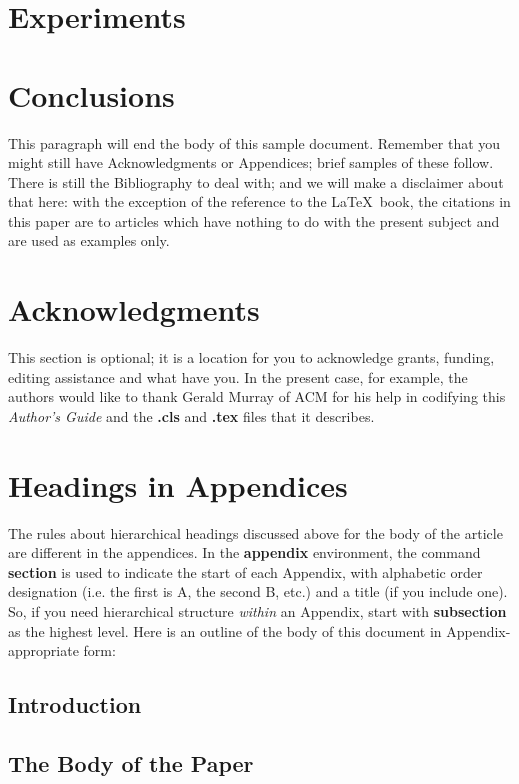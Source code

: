 \documentclass{sig-alternate}
\begin{document}
\section{Experiments}


\section{Conclusions}
This paragraph will end the body of this sample document.
Remember that you might still have Acknowledgments or
Appendices; brief samples of these
follow.  There is still the Bibliography to deal with; and
we will make a disclaimer about that here: with the exception
of the reference to the \LaTeX\ book, the citations in
this paper are to articles which have nothing to
do with the present subject and are used as
examples only.

\section{Acknowledgments}
This section is optional; it is a location for you
to acknowledge grants, funding, editing assistance and
what have you.  In the present case, for example, the
authors would like to thank Gerald Murray of ACM for
his help in codifying this \textit{Author's Guide}
and the \textbf{.cls} and \textbf{.tex} files that it describes.



  
\appendix
\section{Headings in Appendices}
The rules about hierarchical headings discussed above for
the body of the article are different in the appendices.
In the \textbf{appendix} environment, the command
\textbf{section} is used to
indicate the start of each Appendix, with alphabetic order
designation (i.e. the first is A, the second B, etc.) and
a title (if you include one).  So, if you need
hierarchical structure
\textit{within} an Appendix, start with \textbf{subsection} as the
highest level. Here is an outline of the body of this
document in Appendix-appropriate form:
\subsection{Introduction}
\subsection{The Body of the Paper}
\end{document}
